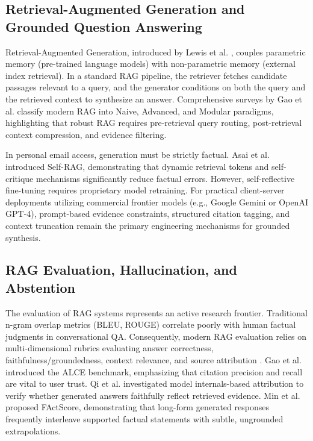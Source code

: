 \documentclass[11pt,a4paper]{article}
\begin{document}
\subsection{Retrieval-Augmented Generation and Grounded Question Answering}
Retrieval-Augmented Generation, introduced by Lewis et al. \cite{lewis2020retrieval}, couples parametric memory (pre-trained language models) with non-parametric memory (external index retrieval). In a standard RAG pipeline, the retriever fetches candidate passages relevant to a query, and the generator conditions on both the query and the retrieved context to synthesize an answer. Comprehensive surveys by Gao et al. \cite{gao2023rag_survey} classify modern RAG into Naive, Advanced, and Modular paradigms, highlighting that robust RAG requires pre-retrieval query routing, post-retrieval context compression, and evidence filtering.

In personal email access, generation must be strictly factual. Asai et al. \cite{asai2024self_rag} introduced Self-RAG, demonstrating that dynamic retrieval tokens and self-critique mechanisms significantly reduce factual errors. However, self-reflective fine-tuning requires proprietary model retraining. For practical client-server deployments utilizing commercial frontier models (e.g., Google Gemini or OpenAI GPT-4), prompt-based evidence constraints, structured citation tagging, and context truncation remain the primary engineering mechanisms for grounded synthesis.

\subsection{RAG Evaluation, Hallucination, and Abstention}
The evaluation of RAG systems represents an active research frontier. Traditional n-gram overlap metrics (BLEU, ROUGE) correlate poorly with human factual judgments in conversational QA. Consequently, modern RAG evaluation relies on multi-dimensional rubrics evaluating answer correctness, faithfulness/groundedness, context relevance, and source attribution \cite{es2024ragas, saad2024ares}. Gao et al. \cite{gao2023enabling} introduced the ALCE benchmark, emphasizing that citation precision and recall are vital to user trust. Qi et al. \cite{qi2024model} investigated model internals-based attribution to verify whether generated answers faithfully reflect retrieved evidence. Min et al. \cite{min2023factscore} proposed FActScore, demonstrating that long-form generated responses frequently interleave supported factual statements with subtle, ungrounded extrapolations.
\end{document}
